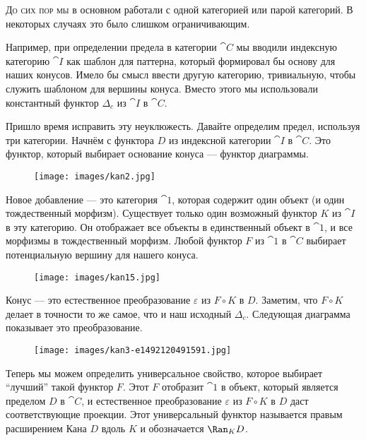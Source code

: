 
\lettrine[lhang=0.17]{Д}{о сих пор мы} в основном работали с одной категорией или парой
категорий. В некоторых случаях это было слишком ограничивающим.

Например, при определении предела в категории $\cat{C}$ мы вводили
индексную категорию $\cat{I}$ как шаблон для паттерна, который
формировал бы основу для наших конусов. Имело бы смысл ввести
другую категорию, тривиальную, чтобы служить шаблоном для вершины
конуса. Вместо этого мы использовали константный функтор $\Delta_c$ из
$\cat{I}$ в $\cat{C}$.

Пришло время исправить эту неуклюжесть. Давайте определим предел, используя три
категории. Начнём с функтора $D$ из индексной
категории $\cat{I}$ в $\cat{C}$. Это функтор, который выбирает основание
конуса --- функтор диаграммы.

\begin{figure}[H]
  \centering
  \texttt{[image: images/kan2.jpg]}
\end{figure}

\noindent
Новое добавление — это категория $\cat{1}$, которая содержит один
объект (и один тождественный морфизм). Существует только один возможный
функтор $K$ из $\cat{I}$ в эту категорию. Он отображает все объекты
в единственный объект в $\cat{1}$, и все морфизмы в тождественный
морфизм. Любой функтор $F$ из $\cat{1}$ в $\cat{C}$ выбирает
потенциальную вершину для нашего конуса.

\begin{figure}[H]
  \centering
  \texttt{[image: images/kan15.jpg]}
\end{figure}

\noindent
Конус — это естественное преобразование $\varepsilon$ из $F \circ K$ в
$D$. Заметим, что $F \circ K$ делает в точности то же самое, что и
наш исходный $\Delta_c$. Следующая диаграмма показывает это
преобразование.

\begin{figure}[H]
  \centering
  \texttt{[image: images/kan3-e1492120491591.jpg]}
\end{figure}

\noindent
Теперь мы можем определить универсальное свойство, которое выбирает ``лучший'' такой
функтор $F$. Этот $F$ отобразит $\cat{1}$ в объект,
который является пределом $D$ в $\cat{C}$, и естественное
преобразование $\varepsilon$ из $F \circ K$ в $D$ даст
соответствующие проекции. Этот универсальный функтор называется
правым расширением Кана $D$ вдоль $K$ и обозначается
$\Ran_{K}D$.

